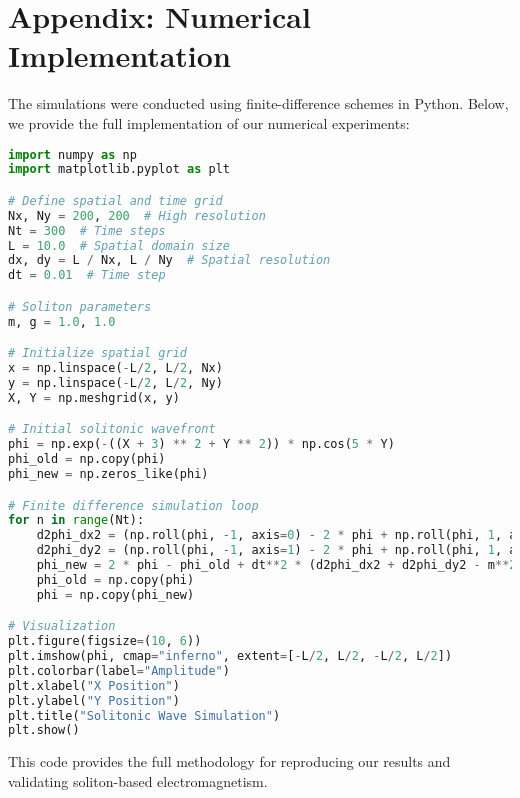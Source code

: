 \documentclass{article}
\begin{document}
\section{Appendix: Numerical Implementation}
The simulations were conducted using finite-difference schemes in Python. Below, we provide the full implementation of our numerical experiments:

\begin{lstlisting}[language=Python, caption=Solitonic Wave Propagation Simulation]
import numpy as np
import matplotlib.pyplot as plt

# Define spatial and time grid
Nx, Ny = 200, 200  # High resolution
Nt = 300  # Time steps
L = 10.0  # Spatial domain size
dx, dy = L / Nx, L / Ny  # Spatial resolution
dt = 0.01  # Time step

# Soliton parameters
m, g = 1.0, 1.0

# Initialize spatial grid
x = np.linspace(-L/2, L/2, Nx)
y = np.linspace(-L/2, L/2, Ny)
X, Y = np.meshgrid(x, y)

# Initial solitonic wavefront
phi = np.exp(-((X + 3) ** 2 + Y ** 2)) * np.cos(5 * Y)
phi_old = np.copy(phi)
phi_new = np.zeros_like(phi)

# Finite difference simulation loop
for n in range(Nt):
    d2phi_dx2 = (np.roll(phi, -1, axis=0) - 2 * phi + np.roll(phi, 1, axis=0)) / dx**2
    d2phi_dy2 = (np.roll(phi, -1, axis=1) - 2 * phi + np.roll(phi, 1, axis=1)) / dy**2
    phi_new = 2 * phi - phi_old + dt**2 * (d2phi_dx2 + d2phi_dy2 - m**2 * phi - g * phi**3)
    phi_old = np.copy(phi)
    phi = np.copy(phi_new)

# Visualization
plt.figure(figsize=(10, 6))
plt.imshow(phi, cmap="inferno", extent=[-L/2, L/2, -L/2, L/2])
plt.colorbar(label="Amplitude")
plt.xlabel("X Position")
plt.ylabel("Y Position")
plt.title("Solitonic Wave Simulation")
plt.show()
\end{lstlisting}

This code provides the full methodology for reproducing our results and validating soliton-based electromagnetism.
\end{document}
